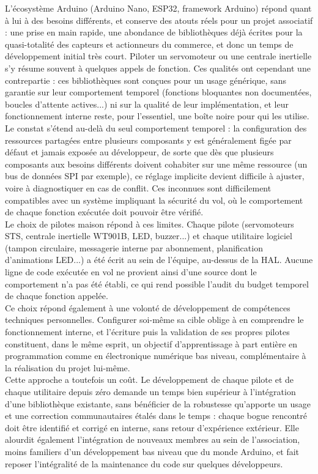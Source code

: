 L'écosystème Arduino (Arduino Nano, ESP32, framework Arduino) répond quant à lui à des besoins différents, et conserve des
atouts réels pour un projet associatif : une prise en main rapide, une abondance de bibliothèques déjà écrites pour la
quasi-totalité des capteurs et actionneurs du commerce, et donc un temps de développement initial très court. Piloter un
servomoteur ou une centrale inertielle s'y résume souvent à quelques appels de fonction. Ces qualités ont cependant une
contrepartie : ces bibliothèques sont conçues pour un usage générique, sans garantie sur leur comportement temporel (fonctions
bloquantes non documentées, boucles d'attente actives...) ni sur la qualité de leur implémentation, et leur fonctionnement
interne reste, pour l'essentiel, une boîte noire pour qui les utilise. Le constat s'étend au-delà du seul comportement temporel :
la configuration des ressources partagées entre plusieurs composants y est généralement figée par défaut et jamais exposée au
développeur, de sorte que dès que plusieurs composants aux besoins différents doivent cohabiter sur une même ressource (un bus
de données \acrshort{SPI} par exemple), ce réglage implicite devient difficile à ajuster, voire à diagnostiquer en cas de
conflit. Ces inconnues sont difficilement compatibles avec un système impliquant la sécurité du vol, où le comportement de
chaque fonction exécutée doit pouvoir être vérifié.\\
 
Le choix de pilotes \og maison \fg{} répond à ces limites. Chaque pilote (servomoteurs STS, centrale inertielle WT901B, LED,
buzzer...) et chaque utilitaire logiciel (tampon circulaire, messagerie interne par abonnement, planification d'animations
LED...) a été écrit au sein de l'équipe, au-dessus de la \acrshort{HAL}. Aucune ligne de code exécutée en vol ne provient ainsi
d'une source dont le comportement n'a pas été établi, ce qui rend possible l'audit du budget temporel de chaque fonction
appelée. \\
 
Ce choix répond également à une volonté de développement de compétences techniques personnelles. Configurer soi-même sa cible
oblige à en comprendre le fonctionnement interne, et l'écriture puis la validation de ses propres pilotes constituent, dans le
même esprit, un objectif d'apprentissage à part entière en programmation comme en électronique numérique bas niveau,
complémentaire à la réalisation du projet lui-même.\\
 
Cette approche a toutefois un coût. Le développement de chaque pilote et de chaque utilitaire depuis zéro demande un temps bien
supérieur à l'intégration d'une bibliothèque existante, sans bénéficier de la robustesse qu'apporte un usage et une correction
communautaires étalés dans le temps : chaque bogue rencontré doit être identifié et corrigé en interne, sans retour d'expérience
extérieur. Elle alourdit également l'intégration de nouveaux membres au sein de l'association, moins familiers d'un développement
bas niveau que du monde Arduino, et fait reposer l'intégralité de la maintenance du code sur quelques développeurs.

